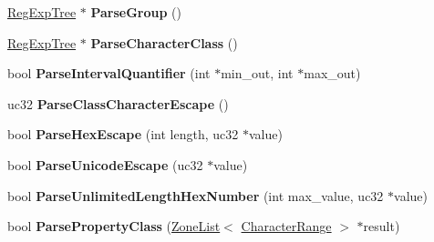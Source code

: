 \begin{DoxyCompactItemize}
\item 
\hyperlink{classv8_1_1internal_1_1_reg_exp_tree}{Reg\+Exp\+Tree} $\ast$ {\bfseries Parse\+Group} ()\hypertarget{classv8_1_1internal_1_1_b_a_s_e___e_m_b_e_d_d_e_d_a2055860eb012047d7ea47d63c83ee7cc}{}\label{classv8_1_1internal_1_1_b_a_s_e___e_m_b_e_d_d_e_d_a2055860eb012047d7ea47d63c83ee7cc}

\item 
\hyperlink{classv8_1_1internal_1_1_reg_exp_tree}{Reg\+Exp\+Tree} $\ast$ {\bfseries Parse\+Character\+Class} ()\hypertarget{classv8_1_1internal_1_1_b_a_s_e___e_m_b_e_d_d_e_d_ac8bb35bf07a72153bb2b145174f4178b}{}\label{classv8_1_1internal_1_1_b_a_s_e___e_m_b_e_d_d_e_d_ac8bb35bf07a72153bb2b145174f4178b}

\item 
bool {\bfseries Parse\+Interval\+Quantifier} (int $\ast$min\+\_\+out, int $\ast$max\+\_\+out)\hypertarget{classv8_1_1internal_1_1_b_a_s_e___e_m_b_e_d_d_e_d_a06daa5f45d2057283cb08686ec75a159}{}\label{classv8_1_1internal_1_1_b_a_s_e___e_m_b_e_d_d_e_d_a06daa5f45d2057283cb08686ec75a159}

\item 
uc32 {\bfseries Parse\+Class\+Character\+Escape} ()\hypertarget{classv8_1_1internal_1_1_b_a_s_e___e_m_b_e_d_d_e_d_a3dc76b72c11dcb540072f3abafcdbfe3}{}\label{classv8_1_1internal_1_1_b_a_s_e___e_m_b_e_d_d_e_d_a3dc76b72c11dcb540072f3abafcdbfe3}

\item 
bool {\bfseries Parse\+Hex\+Escape} (int length, uc32 $\ast$value)\hypertarget{classv8_1_1internal_1_1_b_a_s_e___e_m_b_e_d_d_e_d_aa788d9e7c9c0d209420cd46a093213bc}{}\label{classv8_1_1internal_1_1_b_a_s_e___e_m_b_e_d_d_e_d_aa788d9e7c9c0d209420cd46a093213bc}

\item 
bool {\bfseries Parse\+Unicode\+Escape} (uc32 $\ast$value)\hypertarget{classv8_1_1internal_1_1_b_a_s_e___e_m_b_e_d_d_e_d_ae8e38930f19228156551484d17171680}{}\label{classv8_1_1internal_1_1_b_a_s_e___e_m_b_e_d_d_e_d_ae8e38930f19228156551484d17171680}

\item 
bool {\bfseries Parse\+Unlimited\+Length\+Hex\+Number} (int max\+\_\+value, uc32 $\ast$value)\hypertarget{classv8_1_1internal_1_1_b_a_s_e___e_m_b_e_d_d_e_d_a3aa2afaab6c9563bdeab30c9ddd18681}{}\label{classv8_1_1internal_1_1_b_a_s_e___e_m_b_e_d_d_e_d_a3aa2afaab6c9563bdeab30c9ddd18681}

\item 
bool {\bfseries Parse\+Property\+Class} (\hyperlink{classv8_1_1internal_1_1_zone_list}{Zone\+List}$<$ \hyperlink{classv8_1_1internal_1_1_character_range}{Character\+Range} $>$ $\ast$result)\hypertarget{classv8_1_1internal_1_1_b_a_s_e___e_m_b_e_d_d_e_d_ac2de109954fa68bbde7617c83b8d06de}{}\label{classv8_1_1internal_1_1_b_a_s_e___e_m_b_e_d_d_e_d_ac2de109954fa68bbde7617c83b8d06de}


\end{DoxyCompactItemize}
